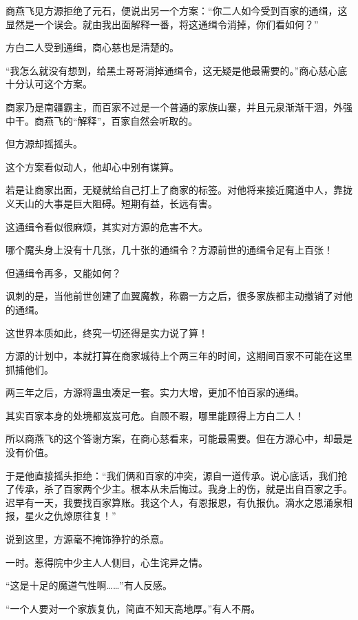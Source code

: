 
\begin{this_body}

商燕飞见方源拒绝了元石，便说出另一个方案：“你二人如今受到百家的通缉，这显然是一个误会。就由我出面解释一番，将这通缉令消掉，你们看如何？”

方白二人受到通缉，商心慈也是清楚的。

“我怎么就没有想到，给黑土哥哥消掉通缉令，这无疑是他最需要的。”商心慈心底十分认可这个方案。

商家乃是南疆霸主，而百家不过是一个普通的家族山寨，并且元泉渐渐干涸，外强中干。商燕飞的“解释”，百家自然会听取的。

但方源却摇摇头。

这个方案看似动人，他却心中别有谋算。

若是让商家出面，无疑就给自己打上了商家的标签。对他将来接近魔道中人，靠拢义天山的大事是巨大阻碍。短期有益，长远有害。

这通缉令看似很麻烦，其实对方源的危害不大。

哪个魔头身上没有十几张，几十张的通缉令？方源前世的通缉令足有上百张！

但通缉令再多，又能如何？

讽刺的是，当他前世创建了血翼魔教，称霸一方之后，很多家族都主动撤销了对他的通缉。

这世界本质如此，终究一切还得是实力说了算！

方源的计划中，本就打算在商家城待上个两三年的时间，这期间百家不可能在这里抓捕他们。

两三年之后，方源将蛊虫凑足一套。实力大增，更加不怕百家的通缉。

其实百家本身的处境都岌岌可危。自顾不暇，哪里能顾得上方白二人！

所以商燕飞的这个答谢方案，在商心慈看来，可能最需要。但在方源心中，却最是没有价值。

于是他直接摇头拒绝：“我们俩和百家的冲突，源自一道传承。说心底话，我们抢了传承，杀了百家两个少主。根本从未后悔过。我身上的伤，就是出自百家之手。迟早有一天，我要找百家算账。我这个人，有恩报恩，有仇报仇。滴水之恩涌泉相报，星火之仇燎原往复！”

说到这里，方源毫不掩饰狰狞的杀意。

一时。惹得院中少主人人侧目，心生诧异之情。

“这是十足的魔道气性啊……”有人反感。

“一个人要对一个家族复仇，简直不知天高地厚。”有人不屑。


\end{this_body}
